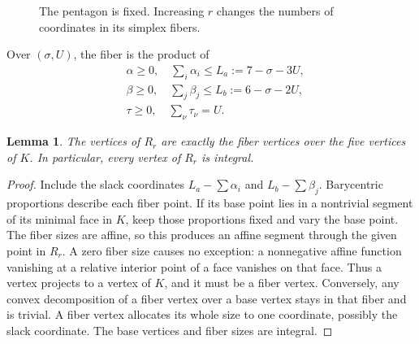 \documentclass[11pt]{article}
\newtheorem{lemma}[theorem]{Lemma}
\theoremstyle{remark}\newtheorem{remark}[theorem]{Remark}
\begin{document}
\begin{figure}[ht]
\centering
{}
\caption{The pentagon is fixed. Increasing \(r\) changes the numbers
of coordinates in its simplex fibers.}
\end{figure}

Over \((\sigma,U)\), the fiber is the product of
\begin{align*}
 &\alpha\ge0,\quad \sum_i\alpha_i\le L_a:=7-\sigma-3U,\\
 &\beta\ge0,\quad \sum_j\beta_j\le L_b:=6-\sigma-2U,\\
 &\tau\ge0,\quad \sum_\nu\tau_\nu=U.
\end{align*}

\begin{lemma}\label{lem:vertices}
The vertices of \(R_r\) are exactly the fiber vertices over the five
vertices of \(K\). In particular, every vertex of \(R_r\) is integral.
\end{lemma}
\begin{proof}
Include the slack coordinates \(L_a-\sum\alpha_i\) and
\(L_b-\sum\beta_j\). Barycentric proportions describe each fiber point.
If its base point lies in a nontrivial segment of its minimal face in
\(K\), keep those proportions fixed and vary the base point.
The fiber sizes are affine, so this produces an affine segment through
the given point in \(R_r\).
A zero fiber size causes no exception: a nonnegative affine function
vanishing at a relative interior point of a face vanishes on that face.
Thus a vertex projects to a vertex of \(K\), and it must be a fiber vertex.
Conversely, any convex decomposition of a fiber vertex over a base
vertex stays in that fiber and is trivial.
A fiber vertex allocates its whole size to one coordinate, possibly
the slack coordinate. The base vertices and fiber sizes are integral.
\end{proof}
\end{document}
